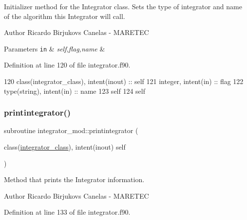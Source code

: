Initializer method for the Integrator class. Sets the type of integrator and name of the algorithm this Integrator will call. 

\begin{DoxyAuthor}{Author}
Ricardo Birjukovs Canelas -\/ M\+A\+R\+E\+T\+EC 
\end{DoxyAuthor}

\begin{DoxyParams}[1]{Parameters}
\mbox{\tt in}  & {\em self,flag,name} & \\
\hline
\end{DoxyParams}


Definition at line 120 of file integrator.\+f90.


\begin{DoxyCode}
120     \textcolor{keywordtype}{class}(integrator\_class), \textcolor{keywordtype}{intent(inout)} :: self
121     \textcolor{keywordtype}{integer}, \textcolor{keywordtype}{intent(in)} :: flag
122     \textcolor{keywordtype}{type}(string), \textcolor{keywordtype}{intent(in)} :: name
123     self%
124     self%
\end{DoxyCode}
\mbox{\label{namespaceintegrator__mod_a6c1df4442c3a9bdef68a4f2f95a403cd}} 
\subsubsection{\texorpdfstring{printintegrator()}{printintegrator()}}
{\footnotesize\ttfamily subroutine integrator\+\_\+mod\+::printintegrator (\begin{DoxyParamCaption}\item[{class(\mbox{\hyperlink{structintegrator__mod_1_1integrator__class}{integrator\+\_\+class}}), intent(inout)}]{self }\end{DoxyParamCaption})\hspace{0.3cm}{\ttfamily [private]}}



Method that prints the Integrator information. 

\begin{DoxyAuthor}{Author}
Ricardo Birjukovs Canelas -\/ M\+A\+R\+E\+T\+EC 
\end{DoxyAuthor}


Definition at line 133 of file integrator.\+f90.


